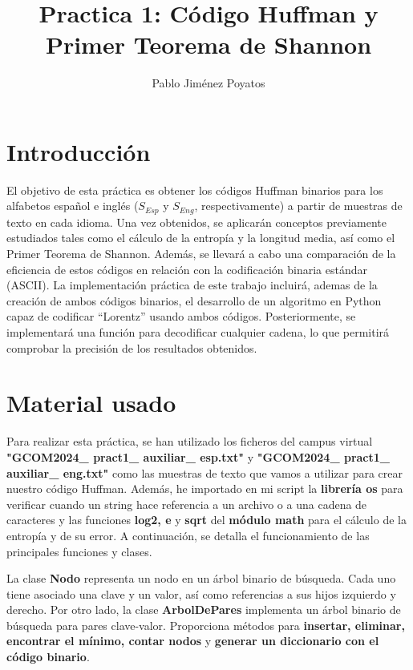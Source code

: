 \documentclass[a4paper]{article}
\title{Practica 1: Código Huffman y Primer Teorema de Shannon}
\author{Pablo Jiménez Poyatos}
\begin{document}
\maketitle

\section{Introducción}

El objetivo de esta práctica es obtener los códigos Huffman binarios para los alfabetos español e inglés ($S_{Esp}$ y $S_{Eng}$, respectivamente) a partir de muestras de texto en cada idioma. Una vez obtenidos, se aplicarán conceptos previamente estudiados tales como el cálculo de la entropía y la longitud media, así como el Primer Teorema de Shannon. Además, se llevará a cabo una comparación de la eficiencia de estos códigos en relación con la codificación binaria estándar (ASCII). La implementación práctica de este trabajo incluirá, ademas de la creación de ambos códigos binarios, el desarrollo de un algoritmo en Python capaz de codificar ``Lorentz'' usando ambos códigos. Posteriormente, se implementará una función para decodificar cualquier cadena, lo que permitirá comprobar la precisión de los resultados obtenidos.

\section{Material usado}

Para realizar esta práctica, se han utilizado los ficheros del campus virtual \textbf{"GCOM2024\_ pract1\_ auxiliar\_ esp.txt"} y \textbf{"GCOM2024\_ pract1\_ auxiliar\_ eng.txt"} como las muestras de texto que vamos a utilizar para crear nuestro código Huffman. Además, he importado en mi script la \textbf{librería os} para verificar cuando un string hace referencia a un archivo o a una cadena de caracteres y las funciones \textbf{log2, e} y \textbf{sqrt} del \textbf{módulo math} para el cálculo de la entropía y de su error.  A continuación, se detalla el funcionamiento de las principales funciones y clases.

\bigskip

La clase \textbf{Nodo} representa un nodo en un árbol binario de búsqueda. Cada uno tiene asociado una clave y un valor, así como referencias a sus hijos izquierdo y derecho. Por otro lado, la clase \textbf{ArbolDePares} implementa un árbol binario de búsqueda para pares clave-valor. Proporciona métodos para \textbf{insertar, eliminar, encontrar el mínimo, contar nodos} y \textbf{generar un diccionario con el código binario}.
\end{document}
